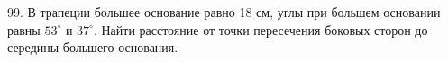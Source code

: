 99. В трапеции большее основание равно 18 см, углы при большем основании равны $53^\circ$ и $37^\circ.$ Найти расстояние от точки пересечения боковых сторон до середины большего основания.\\
